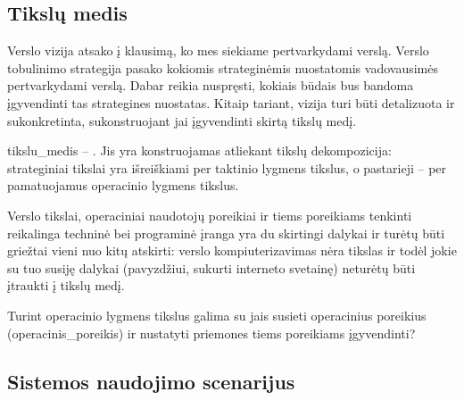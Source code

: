 \subsection{Tikslų medis}

Verslo vizija atsako į klausimą, ko mes siekiame pertvarkydami verslą.
Verslo tobulinimo strategija pasako kokiomis strateginėmis nuostatomis
vadovausimės pertvarkydami verslą. Dabar reikia nuspręsti, kokiais
būdais bus bandoma įgyvendinti tas strategines nuostatas. Kitaip
tariant, vizija turi būti detalizuota ir sukonkretinta, sukonstruojant
jai įgyvendinti skirtą tikslų medį.

\Gls{tikslu_medis} – . Jis yra konstruojamas
atliekant tikslų dekompozicija: strateginiai tikslai yra išreiškiami
per taktinio lygmens tikslus, o pastarieji – per pamatuojamus operacinio
lygmens tikslus.

\begin{note}
  Verslo tikslai, operaciniai naudotojų poreikiai ir tiems poreikiams
  tenkinti reikalinga techninė bei programinė įranga yra du skirtingi
  dalykai ir turėtų būti griežtai vieni nuo kitų atskirti: verslo
  kompiuterizavimas nėra tikslas ir todėl jokie su tuo susiję dalykai
  (pavyzdžiui, sukurti interneto svetainę) neturėtų būti įtraukti į tikslų 
  medį.
\end{note}

%
%
%
% 
Turint operacinio lygmens tikslus galima su jais susieti operacinius
poreikius (\gls{operacinis_poreikis}) ir nustatyti priemones tiems
poreikiams įgyvendinti?

\subsection{Sistemos naudojimo scenarijus}

